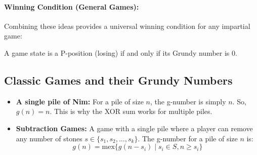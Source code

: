 \paragraph{Winning Condition (General Games):}
Combining these ideas provides a universal winning condition for any impartial game:
\begin{center}
    A game state is a P-position (losing) if and only if its Grundy number is 0.
\end{center}

\subsection*{Classic Games and their Grundy Numbers}
\begin{itemize}
    \item \textbf{A single pile of Nim:} For a pile of size $n$, the g-number is simply $n$. So, $g(n) = n$. This is why the XOR sum works for multiple piles.
    \item \textbf{Subtraction Games:} A game with a single pile where a player can remove any number of stones $s \in \{s_1, s_2, \dots, s_k\}$. The g-number for a pile of size $n$ is:
    $$ g(n) = \text{mex} \{ g(n-s_i) \mid s_i \in S, n \ge s_i \} $$
\end{itemize}
